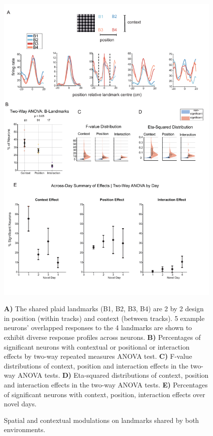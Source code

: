 \begin{figure}
    \centering
    \includegraphics[width=1\linewidth]{figures//Chapter 4 V1/fig4_spatial_modulation_tests.pdf}
    \caption{Spatial and contextual modulations on landmarks shared by both environments. }
\medskip
\small
\textbf{A)} The shared plaid landmarks (B1, B2, B3, B4) are 2 by 2 design in position (within tracks) and context (between tracks). 5 example neurons' overlapped responses to the 4 landmarks are shown to exhibit diverse response profiles across neurons. \textbf{B)} Percentages of significant neurons with contextual or positional or interaction effects by two-way repeated measures ANOVA test. \textbf{C)} F-value distributions of context, position and interaction effects in the two-way ANOVA tests. \textbf{D)} Eta-squared distributions of context, position and interaction effects in the two-way ANOVA tests.  \textbf{E)} Percentages of significant neurons with context, position, interaction effects over novel days. 
    \label{fig:placeholder}
\end{figure}


